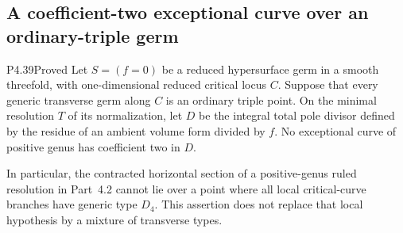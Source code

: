 \subsection{A coefficient-two exceptional curve over an ordinary-triple germ}

\begin{statement}{P4.39}{Proved}
Let $S=(f=0)$ be a reduced hypersurface germ in a smooth
threefold, with one-dimensional reduced critical locus $C$.
Suppose that every generic transverse germ along $C$ is an
ordinary triple point. On the minimal resolution $T$ of its
normalization, let $D$ be the integral total pole divisor
defined by the residue of an ambient volume form divided by
$f$. No exceptional curve of positive genus has coefficient
two in $D$.

In particular, the contracted horizontal section of a
positive-genus ruled resolution in Part~4.2 cannot lie over
a point where all local critical-curve branches have generic
type $D_4$. This assertion does not replace that local
hypothesis by a mixture of transverse types.
\end{statement}
